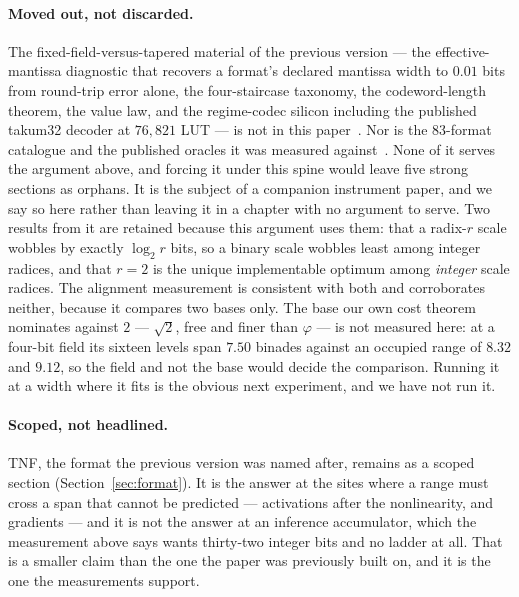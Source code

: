 \documentclass[11pt]{article}
\theoremstyle{definition}
\begin{document}
\paragraph{Moved out, not discarded.} The fixed-field-versus-tapered material
of the previous version --- the effective-mantissa diagnostic that recovers a
format's declared mantissa width to $0.01$ bits from round-trip error alone,
the four-staircase taxonomy, the codeword-length theorem, the value law, and
the regime-codec silicon including the published takum32 decoder at $76{,}821$
LUT --- is not in this paper~\cite{takum,tekum,takumrtl,gustafson,elias1975}.
Nor is the 83-format catalogue and the published oracles it was measured
against~\cite{catalogue,goldenfloat,mlformats}. None of it serves the argument above, and forcing
it under this spine would leave five strong sections as orphans. It is the
subject of a companion instrument paper, and we say so here rather than leaving
it in a chapter with no argument to serve.
Two results from it are retained because this argument uses them: that a
radix-$r$ scale wobbles by exactly $\log_{2} r$ bits, so a binary scale wobbles
least among integer radices, and that $r=2$ is the unique implementable optimum
among \emph{integer} scale radices. The alignment measurement is consistent
with both and corroborates neither, because it compares two bases only. The
base our own cost theorem nominates against $2$ --- $\sqrt{2}$, free and finer
than $\varphi$ --- is not measured here: at a four-bit field its sixteen levels
span $7.50$ binades against an occupied range of $8.32$ and $9.12$, so the
field and not the base would decide the comparison. Running it at a width where
it fits is the obvious next experiment, and we have not run it.

\paragraph{Scoped, not headlined.} TNF, the format the previous version was
named after, remains as a scoped section (Section~\ref{sec:format}). It is the
answer at the sites where a range must cross a span that cannot be predicted
--- activations after the nonlinearity, and gradients --- and it is not the
answer at an inference accumulator, which the measurement above says wants
thirty-two integer bits and no ladder at all. That is a smaller claim than the
one the paper was previously built on, and it is the one the measurements
support.

\end{document}
